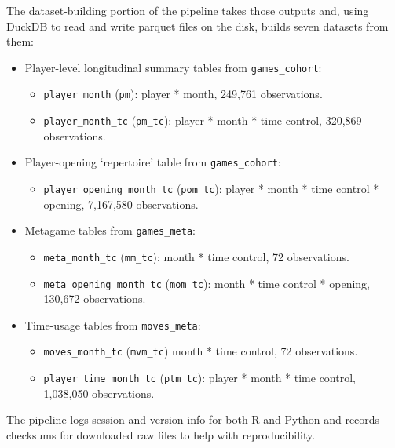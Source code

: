 \documentclass[
  12pt]{article}
\providecommand{\tightlist}{%
  \setlength{\itemsep}{0pt}\setlength{\parskip}{0pt}}\usepackage{longtable,booktabs,array}
\begin{document}
The dataset-building portion of the pipeline takes those outputs and,
using DuckDB to read and write parquet files on the disk, builds seven
datasets from them:

\begin{itemize}
\tightlist
\item
  Player-level longitudinal summary tables from \texttt{games\_cohort}:

  \begin{itemize}
  \tightlist
  \item
    \texttt{player\_month} (\texttt{pm}): player * month, 249,761
    observations.
  \item
    \texttt{player\_month\_tc} (\texttt{pm\_tc}): player * month * time
    control, 320,869 observations.
  \end{itemize}
\item
  Player-opening `repertoire' table from \texttt{games\_cohort}:

  \begin{itemize}
  \tightlist
  \item
    \texttt{player\_opening\_month\_tc} (\texttt{pom\_tc}): player *
    month * time control * opening, 7,167,580 observations.
  \end{itemize}
\item
  Metagame tables from \texttt{games\_meta}:

  \begin{itemize}
  \tightlist
  \item
    \texttt{meta\_month\_tc} (\texttt{mm\_tc}): month * time control, 72
    observations.
  \item
    \texttt{meta\_opening\_month\_tc} (\texttt{mom\_tc}): month * time
    control * opening, 130,672 observations.
  \end{itemize}
\item
  Time-usage tables from \texttt{moves\_meta}:

  \begin{itemize}
  \tightlist
  \item
    \texttt{moves\_month\_tc} (\texttt{mvm\_tc}) month * time control,
    72 observations.
  \item
    \texttt{player\_time\_month\_tc} (\texttt{ptm\_tc}): player * month
    * time control, 1,038,050 observations.
  \end{itemize}
\end{itemize}

The pipeline logs session and version info for both R and Python and
records checksums for downloaded raw files to help with reproducibility.
\end{document}
